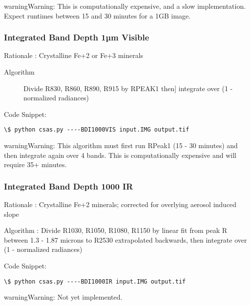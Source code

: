 \documentclass[letterpaper,10pt,english]{sphinxmanual}
\begin{document}
\begin{notice}{warning}{Warning:}
This is computationally expensive, and a slow implementation.  Expect runtimes between 15 and 30 minutes for a 1GB image.
\end{notice}


\subsubsection{Integrated Band Depth 1µm Visible}
\label{Algorithms:integrated-band-depth-1m-visible}
Rationale : Crystalline Fe+2 or Fe+3 minerals
\begin{description}
\item[{Algorithm}] \leavevmode{[}Divide R830, R860, R890, R915 by RPEAK1 then{]}
integrate over (1 -  normalized radiances)

\end{description}

Code Snippet:

\begin{Verbatim}[commandchars=\\\{\}]
\$ python csas.py ----BDI1000VIS input.IMG output.tif
\end{Verbatim}

\begin{notice}{warning}{Warning:}
This algorithm must first run RPeak1 (15 - 30 minutes) and then integrate again over 4 bands.  This is computationally expensive and will require 35+ minutes.
\end{notice}


\subsubsection{Integrated Band Depth 1000 IR}
\label{Algorithms:integrated-band-depth-1000-ir}
Rationale : Crystalline Fe+2 minerals; corrected for overlying aerosol induced slope

Algorithm : Divide R1030, R1050, R1080, R1150 by linear fit from peak R  between 1.3 - 1.87 microns to R2530 extrapolated backwards, then integrate over (1 -  normalized radiances)

Code Snippet:

\begin{Verbatim}[commandchars=\\\{\}]
\$ python csas.py ----BDI1000IR input.IMG output.tif
\end{Verbatim}

\begin{notice}{warning}{Warning:}
Not yet implemented.
\end{notice}
\end{document}
